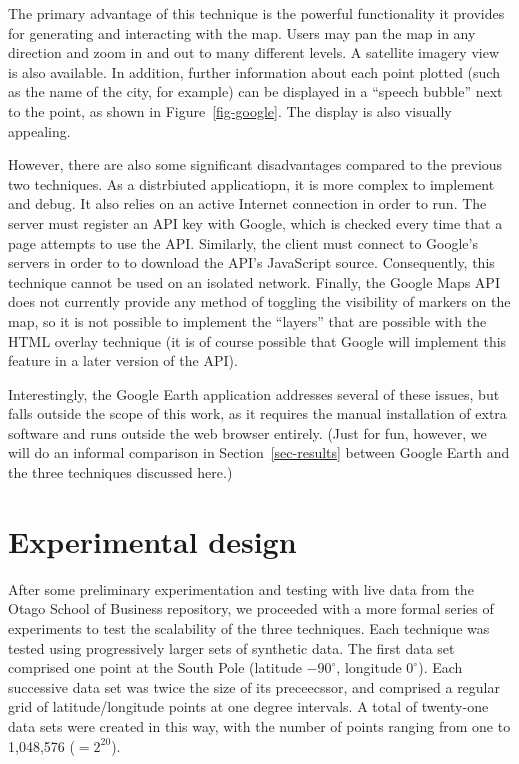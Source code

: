 \documentclass[acmtocl,acmnow]{acmtrans2m}
\begin{document}
The primary advantage of this technique is the powerful functionality it
provides for generating and interacting with the map. Users may pan the
map in any direction and zoom in and out to many different levels. A
satellite imagery view is also available. In addition, further
information about each point plotted (such as the name of the city, for
example) can be displayed in a ``speech bubble'' next to the point, as
shown in Figure~\ref{fig-google}. The display is also visually appealing.

However, there are also some significant disadvantages compared to the
previous two techniques. As a distrbiuted applicatiopn, it is more
complex to implement and debug. It also relies on an active Internet
connection in order to run. The server must register an API key with
Google, which is checked every time that a page attempts to use the API.
Similarly, the client must connect to Google's servers in order to to
download the API's JavaScript source. Consequently, this technique
cannot be used on an isolated network. Finally, the Google Maps API does
not currently provide any method of toggling the visibility of markers
on the map, so it is not possible to implement the ``layers'' that are
possible with the HTML overlay technique (it is of course possible that
Google will implement this feature in a later version of the API).

Interestingly, the Google Earth application addresses several of these
issues, but falls outside the scope of this work, as it requires the
manual installation of extra software and runs outside the web browser
entirely. (Just for fun, however, we will do an informal comparison in
Section~\ref{sec-results} between Google Earth and the three techniques
discussed here.)


\section{Experimental design}
\label{sec-experiment}

After some preliminary experimentation and testing with live data from
the Otago School of Business repository, we proceeded with a more formal
series of experiments to test the scalability of the three techniques.
Each technique was tested using progressively larger sets of synthetic
data. The first data set comprised one point at the South Pole (latitude
\(-90^{\circ}\), longitude \(0^{\circ}\)). Each successive data set was twice
the size of its preceecssor, and comprised a regular grid of
latitude/longitude points at one degree intervals. A total of twenty-one
data sets were created in this way, with the number of points ranging
from one to 1,048,576 (\(=2^{20}\)).
\end{document}
